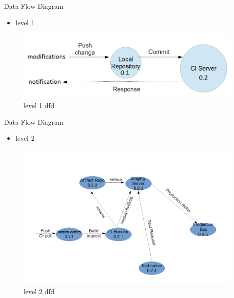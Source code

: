 \documentclass{beamer}
\begin{document}
\begin{frame}{Data Flow Diagram}
\begin{itemize}
\item level 1
\end{itemize}
\begin{figure}[h]
\begin{center}
\includegraphics[scale=0.28]{dfd2.png}
\caption{level 1 dfd}
\end{center}
\end{figure}
\end{frame}

\begin{frame}{Data Flow Diagram}
\begin{itemize}
\item level 2
\end{itemize}
\begin{figure}[h]
\begin{center}
\includegraphics[scale=0.28]{dfd3.png}
\caption{level 2 dfd}
\end{center}
\end{figure}
\end{frame}
\end{document}
